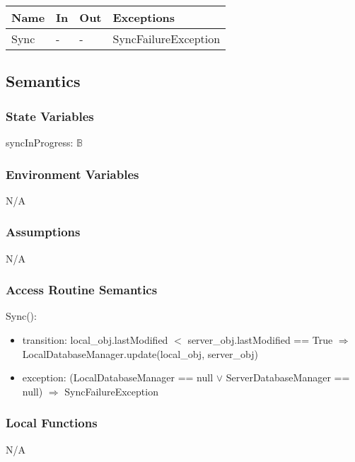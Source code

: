 \documentclass[12pt, titlepage]{article}
\begin{document}
\begin{center}
\begin{tabular}{p{2cm} p{4cm} p{4cm} p{2cm}}
\hline
\textbf{Name} & \textbf{In} & \textbf{Out} & \textbf{Exceptions} \\
\hline
Sync & - & - & SyncFailureException \\
\hline
\end{tabular}
\end{center}

\subsection{Semantics}

\subsubsection{State Variables}

syncInProgress: $\mathbb{B}$

\subsubsection{Environment Variables}

N/A

\subsubsection{Assumptions}

N/A

\subsubsection{Access Routine Semantics}

\noindent Sync():
\begin{itemize}
\item transition: local\_obj.lastModified $<$ server\_obj.lastModified == True $\Rightarrow$ LocalDatabaseManager.update(local\_obj, server\_obj)
\item exception: (LocalDatabaseManager == null $\vee$ ServerDatabaseManager == null) $\Rightarrow$ SyncFailureException
\end{itemize}

\subsubsection{Local Functions}

N/A
\end{document}
